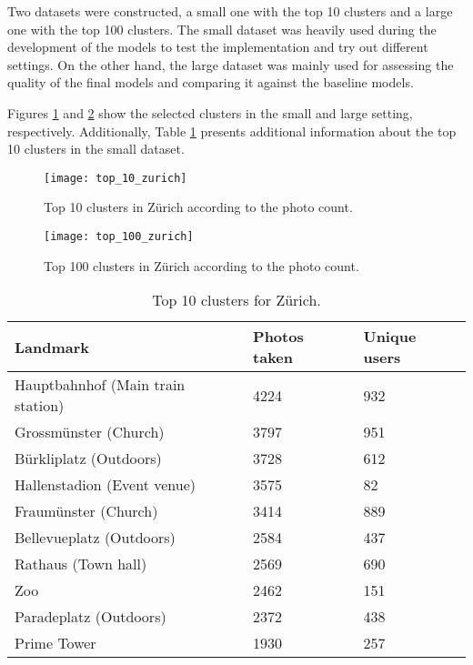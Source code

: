 Two datasets were constructed, a small one with the top 10 clusters and a large one with the top 100 clusters. The small dataset was heavily used during the development of the models to test the implementation and try out different settings. On the other hand, the large dataset was mainly used for assessing the quality of the final models and comparing it against the baseline models.

Figures \ref{fig:top_10_zurich} and \ref{fig:top_100_zurich} show the selected clusters in the small and large setting, respectively. Additionally, Table \ref{tab:top_10_clusters} presents additional information about the top 10 clusters in the small dataset.

\begin{figure}
  \centering
  \texttt{[image: top\_10\_zurich]}
  \caption{Top 10 clusters in Zürich according to the photo count.}
  \label{fig:top_10_zurich}
\end{figure}

\begin{figure}
  \centering
  \texttt{[image: top\_100\_zurich]}
  \caption{Top 100 clusters in Zürich according to the photo count.}
  \label{fig:top_100_zurich}
\end{figure}


\begin{table}
  \centering
  \caption{Top 10 clusters for Zürich.}
  \begin{tabular}{@{}lll@{}}
    \toprule
    Landmark & Photos taken & Unique users  \\
    \midrule
    Hauptbahnhof (Main train station) & 4224 & 932 \\
    Grossmünster (Church) & 3797 & 951 \\
    Bürkliplatz (Outdoors) & 3728 & 612 \\
    Hallenstadion (Event venue) & 3575 & 82 \\
    Fraumünster (Church) & 3414 & 889 \\
    Bellevueplatz (Outdoors) & 2584 & 437 \\
    Rathaus (Town hall) & 2569 & 690 \\
    Zoo & 2462 & 151 \\
    Paradeplatz (Outdoors) & 2372 & 438 \\
    Prime Tower & 1930 & 257 \\
    \bottomrule
  \end{tabular}
  \label{tab:top_10_clusters}
\end{table}

